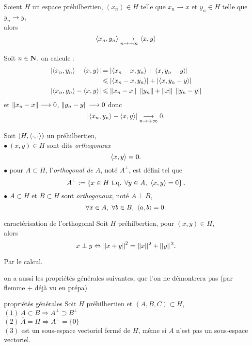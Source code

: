 \documentclass[a4paper,11pt, twoside]{article}
\begin{document}
\begin{prop}
  Soient $H$ un espace préhilbertien, $(x_n)\in H$ telle que $x_n\longrightarrow x$ et $y_n\in H$ telle que $y_n\longrightarrow y$,\\

  alors
  $$\langle x_n,y_n\rangle\underset{n\to+\infty}{\longrightarrow} \langle x,y\rangle$$
\end{prop}


\begin{Proof}
  Soit $n\in\mathbf N$, on calcule :
  \begin{align*}
    \left|\langle x_n,y_n\rangle-\left\langle x,y \right\rangle\right|&=\left| \left\langle x_n-x,y_n \right\rangle+\left\langle x,y_n-y \right\rangle\right|\\
    &\leqslant \left| \left\langle x_n-x,y_n \right\rangle\right|+\left| \left\langle x,y_n-y \right\rangle\right|\\
    \left|\langle x_n,y_n\rangle-\left\langle x,y \right\rangle\right|&\leqslant \left\lVert x_n-x\right\rVert\ \left\lVert y_n\right\rVert+\left\lVert x\right\rVert\ \left\lVert y_n-y\right\rVert
  \end{align*}
  et $\left\lVert x_n-x\right\rVert\longrightarrow 0$, $\left\lVert y_n-y\right\rVert\longrightarrow 0$ donc 
  $$\left|\langle x_n,y_n\rangle-\left\langle x,y \right\rangle\right|\underset{n\to+\infty}{\longrightarrow} 0.$$
\end{Proof}


\begin{Def}
  Soit $(H,\left\langle \cdot,\cdot \right\rangle)$ un préhilbertien,\\
  $\bullet\ (x,y)\in H$ sont dits \emph{orthogonaux} \ssi 
  $$\left\langle x,y \right\rangle=0.$$
  $\bullet$ pour $A\subset H$, l'\emph{orthogonal de }$A$, noté $A^\bot$, est défini tel que 
  $$A^\bot:=\left\{x\in H\text{ t.q. } \forall y\in A,\ \left\langle x,y \right\rangle=0\right\}.$$
  $\bullet$ $A\subset H$ et $B\subset H$ sont \emph{orthogonaux}, noté $A\perp B$, \ssi
  $$\forall x\in A,\ \forall b\in B,\ \ps{a,b}=0.$$
\end{Def}


\begin{propC}{caractérisation de l'orthogonal}
  Soit $H$ préhilbertien, pour $(x,y)\in H$,\\

  alors 
  $$x\perp y\Leftrightarrow \left\lVert x+y\right\rVert^2=||x||^2+||y||^2.$$
\end{propC}


\begin{Proof}
  Par le calcul.
\end{Proof}


on a aussi les propriétés générales suivantes, que l'on ne démontrera pas (par flemme + déjà vu en prépa)


\begin{propC}{propriétés générales}
  Soit $H$ préhilbertien et $(A,B,C)\subset H$,\\

  $(\mathit 1)\ A\subset B\Rightarrow A^\bot\supset B^\bot$\\
  $(\mathit 2)\ \overline{A}=H\Rightarrow A^\bot=\{0\}$\\
  $(\mathit 3)$ est un sous-espace vectoriel fermé de $H$, même si $A$ n'est pas un sous-espace vectoriel.
\end{propC}
\end{document}
